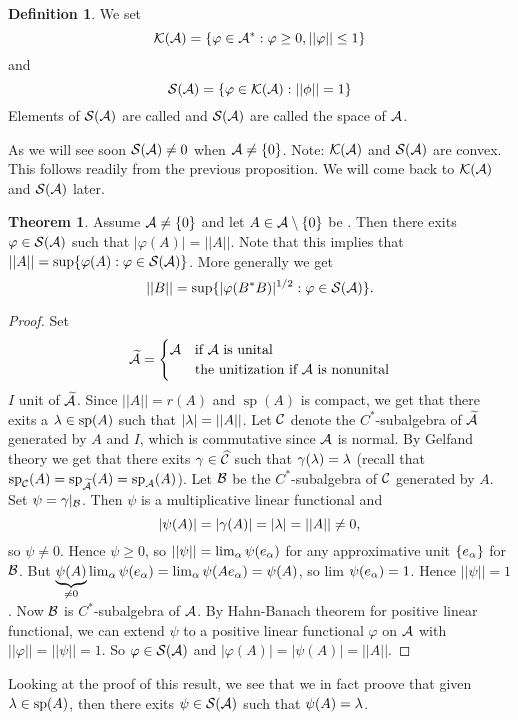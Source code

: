 \documentclass[10pt,english,a4paper]{article}
\theoremstyle{definition}
\newtheorem*{definition}{Definition}
\newtheorem*{theorem}{Theorem}
\let\emph\relax %
\def\tAs{\widetilde{\As}}
\DeclareMathOperator{\Sp}{sp}
\def\vphi{\varphi}
\begin{document}
\begin{definition}
    We set \[\Ks(\As) = \{ \vphi \in \As^* : \vphi\geq 0, ||\vphi||\leq 1 \}\]
    and 
    \[ \Ss(\As) = \{ \vphi \in \Ks(\As) : ||\phi||=1 \} \]
    Elements of $\mathcal{S}(\mathcal{A})$ are called \emph{states} and $\mathcal{S}(\mathcal{A})$ are called the 
    \emph{state} space of $\mathcal{A}$. 
\end{definition}

As we will see soon $\mathcal{S}(\mathcal{A}) \neq 0$ when $\mathcal{A} \neq \{0\}$.
Note:  $\mathcal{K}(\mathcal{A})$ and $\mathcal{S}(\mathcal{A})$ are convex. This follows readily from the previous 
proposition. We will come back to $\mathcal{K}(\mathcal{A})$ and $\mathcal{S}(\mathcal{A})$ later. 
\begin{theorem}
    Assume $\mathcal{A} \neq \{0\}$ and let $A \in \mathcal{A}\setminus\{0\}$ be \emph{normal}.
    Then there exits $\vphi\in \Ss(\As)$ such that 
    $|\vphi(A)| = ||A||$. 
    Note that this implies that $||A|| = \sup\{ \vphi(A) : \vphi \in \Ss(\As)\}$.
    More generally we get 
    \[ ||B|| = \sup\{ |\vphi(B^*B)|^{1/2} : \vphi \in \Ss(\As)\}. \]

\end{theorem}

\begin{proof}
    Set 
\[\tAs = \begin{cases} \As &\text{if $\As$ is unital} \\&\text{the unitization if $\As$ is nonunital} \end{cases}\]
$I$ unit of $\tAs$. Since $||A||=r(A)$ and $\Sp(A)$ is compact, we get that 
there exits a $\la \in \Sp(A)$ such that $|\lambda| = ||A||$.
Let $\mathcal{C}$ denote the $C^*$-subalgebra of $\tAs$ generated by 
$A$ and $I$, which is commutative since $\mathcal{A}$ is normal. 
By Gelfand theory we get that there exits $\gamma \in \widehat{\mathcal{C}}$
such that $\gamma(\lambda) = \lambda$ (recall that $\Sp_{\Cs}(A) = \Sp_{\tAs}(A) = \Sp_{\As}(A)$).
Let $\mathcal{B}$ be the $C^*$-subalgebra of $\mathcal{C}$ generated by $A$. Set $\psi=\gamma\lvert_{\mathcal{B}}$.
Then $\psi$ is a multiplicative linear functional and 
\[ |\psi(A)| = |\gamma(A)| = |\lambda| = ||A|| \neq 0, \] 
so $\psi\neq0$.
Hence $\psi\geq 0$, so $||\psi|| = \lim_{\alpha}\psi(e_{\alpha})$ for any approximative 
unit $\{e_{\alpha}\}$ for $\mathcal{B}$. But $\underbrace{\psi(A)}_{\neq 0} \lim_{\alpha}\psi(e_{\alpha}) 
= \lim_{\alpha}\psi(Ae_{\alpha}) = \psi(A)$, so lim $\psi(e_{\alpha})=1$.
Hence $||\psi||=1$. Now $\mathcal{B}$ is $C^*$-subalgebra of $\mathcal{A}$. By Hahn-Banach theorem 
for positive linear functional, we can extend $\psi$ to a positive linear functional 
$\vphi$ on $\mathcal{A}$ with $||\vphi|| = ||\psi|| = 1$.
So $\vphi \in \Ss(\As)$ and $|\vphi(A)| = |\psi(A)|=||A||$.
\end{proof}
Looking at the proof of this result, we see that we in fact proove that given 
$\la \in \Sp(A)$, then there exits $\psi \in \mathcal{S}(\mathcal{A})$ such that $\psi(A) = \lambda$.
\end{document}
